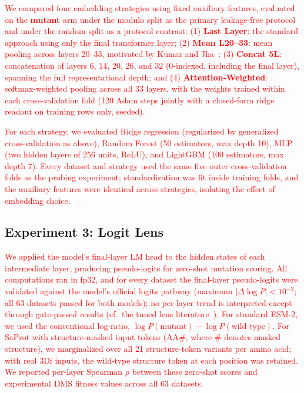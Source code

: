 \documentclass[numbered,webpdf,modern,large]{oup-authoring-template}
\newcommand{\rev}[1]{\textcolor{red}{#1}}
\begin{document}
\rev{We compared four embedding strategies using fixed auxiliary features,
evaluated on the \textbf{mutant} arm under the modulo split as the primary
leakage-free protocol and under the random split as a protocol contrast: (1)
\textbf{Last Layer}: the standard approach using only the
final transformer layer;
(2) \textbf{Mean L20--33}: mean pooling across layers 20--33, motivated by
Kumar and Jha~\cite{kumar2025};
(3) \textbf{Concat 5L}: concatenation of layers 6, 14, 20, 26, and 32 (0-indexed,
including the final layer), spanning the full representational depth; and
(4) \textbf{Attention-Weighted}: softmax-weighted pooling across all 33 layers, with
the weights trained within each cross-validation fold (120 Adam steps jointly
with a closed-form ridge readout on training rows only, seeded).}

\rev{For each strategy, we evaluated Ridge regression (regularized by generalized
cross-validation as above), Random Forest (50 estimators,
max depth 10), MLP (two hidden layers of 256 units, ReLU), and LightGBM (100
estimators, max depth 7). Every dataset and strategy used the same five outer
cross-validation folds as the probing experiment; standardization was fit inside
training folds, and the auxiliary
features were identical across strategies, isolating the effect of embedding choice.}

\subsection{Experiment 3: Logit Lens}

\rev{We applied the model's final-layer LM head to the hidden states of each
intermediate layer, producing pseudo-logits for zero-shot mutation scoring. All
computations ran in fp32, and for every dataset the final-layer pseudo-logits were
validated against the model's official logits pathway (maximum $|\Delta \log P| <
10^{-3}$; all 63 datasets passed for both models); no per-layer trend is
interpreted except through gate-passed results
(cf.\ the tuned lens literature~\cite{belrose2023eliciting}). For standard ESM-2, we
used the conventional log-ratio, $\log P(\text{mutant}) - \log P(\text{wild-type})$.
For SaProt with structure-masked input tokens ($\text{AA}\#$, where $\#$ denotes
masked structure), we marginalized over all 21 structure-token variants per amino
acid; with real 3Di inputs, the wild-type structure token at each position was
retained. We reported per-layer Spearman $\rho$ between these zero-shot scores and
experimental DMS fitness values across all 63 datasets.}
\end{document}
